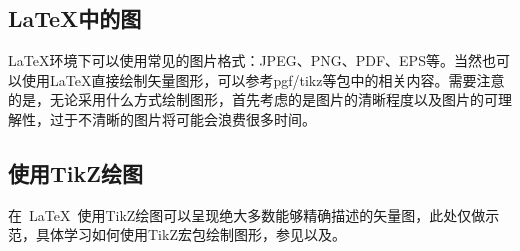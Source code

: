\subsection{\LaTeX 中的图}

\LaTeX 环境下可以使用常见的图片格式：JPEG、PNG、PDF、EPS等。当然也可以使用\LaTeX 直接绘制矢量图形，可以参考pgf/tikz等包中的相关内容。需要注意的是，无论采用什么方式绘制图形，首先考虑的是图片的清晰程度以及图片的可理解性，过于不清晰的图片将可能会浪费很多时间。

\subsection{使用TikZ绘图}

在~\LaTeX~使用TikZ绘图可以呈现绝大多数能够精确描述的矢量图，此处仅做示范，具体学习如何使用TikZ宏包绘制图形，参见以及。

